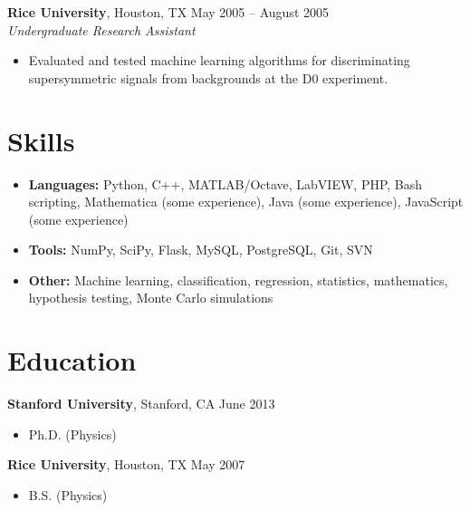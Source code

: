 \documentclass[margin,line]{resume}
\begin{document}
\begin{resume}
    \textbf{Rice University}, Houston, TX \hfill May 2005 -- August 2005 \vspace{1mm}\\\vspace{1mm}%
    \textsl{Undergraduate Research Assistant}
    \begin{itemize}
    \item Evaluated and tested machine learning algorithms for discriminating supersymmetric signals from backgrounds at the D0 experiment.
    \end{itemize}
    
    \section{\mysidestyle Skills}\vspace{0mm}%
    \begin{itemize}
    \item \textbf{Languages:} Python, C++, MATLAB/Octave, LabVIEW, PHP, Bash scripting, Mathematica (some experience), Java (some experience), JavaScript (some experience)
    \item \textbf{Tools:} NumPy, SciPy, Flask, MySQL, PostgreSQL, Git, SVN
    \item \textbf{Other:} Machine learning, classification, regression, statistics, mathematics, hypothesis testing, Monte Carlo simulations
    \end{itemize}
    
    \section{\mysidestyle Education}

    \textbf{Stanford University}, Stanford, CA \hfill June 2013\vspace{-3mm}\\\vspace{-1mm}%
    \begin{itemize}
    \item Ph.D. (Physics)
    \end{itemize}\vspace{-1.5mm}
    
    \textbf{Rice University}, Houston, TX \hfill May 2007\vspace{-3mm}\\\vspace{-1mm}%
    \begin{itemize}
    \item B.S. (Physics)
    \end{itemize}\vspace{-1.5mm}
 

\end{resume}
\end{document}
